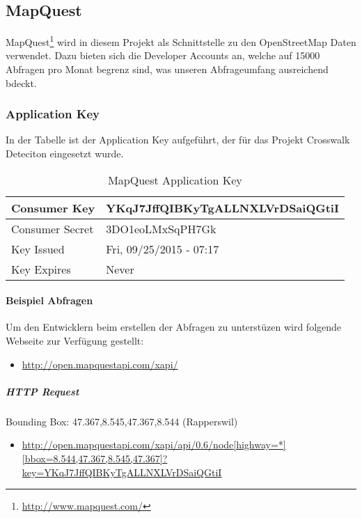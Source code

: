 \subsection{MapQuest}
MapQuest\footnote{\url{http://www.mapquest.com/}} wird in diesem Projekt als Schnittstelle zu den OpenStreetMap Daten verwendet. Dazu bieten sich die Developer Accounts an, welche auf 15000 Abfragen pro Monat begrenz sind, was unseren Abfrageumfang ausreichend bdeckt.\\

\subsubsection{Application Key}
In der Tabelle ist der Application Key aufgeführt, der für das Projekt Crosswalk Deteciton eingesetzt wurde.
\begin{table}[H]
    \begin{tabular}{ | p{6cm} | p{6cm}  | }
    \hline    
	Consumer Key &  YKqJ7JffQIBKyTgALLNXLVrDSaiQGtiI \\ \hline
	Consumer Secret & 3DO1eoLMxSqPH7Gk \\ \hline
	Key Issued & Fri, 09/25/2015 - 07:17 \\ \hline
	Key Expires & Never \\ \hline
    \end{tabular}
    \caption[MapQuest Application Key]{MapQuest Application Key}
\end{table}

\paragraph{Beispiel Abfragen}
Um den Entwicklern beim erstellen der Abfragen zu unterstüzen wird folgende Webseite zur Verfügung gestellt:
\begin{itemize}
	\item \url{http://open.mapquestapi.com/xapi/}
\end{itemize}

\subparagraph{HTTP Request}
Bounding Box:  47.367,8.545,47.367,8.544 (Rapperswil)
\begin{itemize}
	\item \url{http://open.mapquestapi.com/xapi/api/0.6/node[highway=*][bbox=8.544,47.367,8.545,47.367]?key=YKqJ7JffQIBKyTgALLNXLVrDSaiQGtiI}
\end{itemize}










